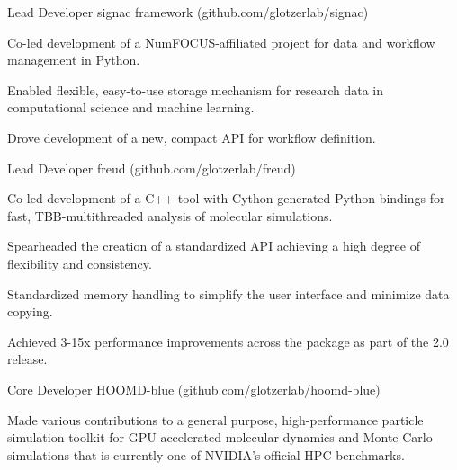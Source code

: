 \begin{cventries}
  \cventry
    {Lead Developer} %
    {signac framework ({\tiny github.com/glotzerlab/signac})} %
    {} %
    {} %
    {
      \begin{cvitems} %
        \item Co-led development of a NumFOCUS-affiliated project for data and workflow management in Python.
        \item Enabled flexible, easy-to-use storage mechanism for research data in computational science and machine learning.
        \item Drove development of a new, compact API for workflow definition.
      \end{cvitems}
    }
  \cventry
    {Lead Developer} %
    {freud ({\tiny github.com/glotzerlab/freud})} %
    {} %
    {} %
    {
      \begin{cvitems} %
        \item Co-led development of a C++ tool with Cython-generated Python bindings for fast, TBB-multithreaded analysis of molecular simulations.
        \item Spearheaded the creation of a standardized API achieving a high degree of flexibility and consistency.
        \item Standardized memory handling to simplify the user interface and minimize data copying.
        \item Achieved 3-15x performance improvements across the package as part of the 2.0 release.
      \end{cvitems}
    }
  \cventry
    {Core Developer} %
    {HOOMD-blue ({\tiny github.com/glotzerlab/hoomd-blue})} %
    {} %
    {} %
    {
      \begin{cvitems} %
        \item Made various contributions to a general purpose, high-performance particle simulation toolkit for GPU-accelerated molecular dynamics and Monte Carlo simulations that is currently one of NVIDIA's official HPC benchmarks.

\end{cvitems}}
\end{cventries}
